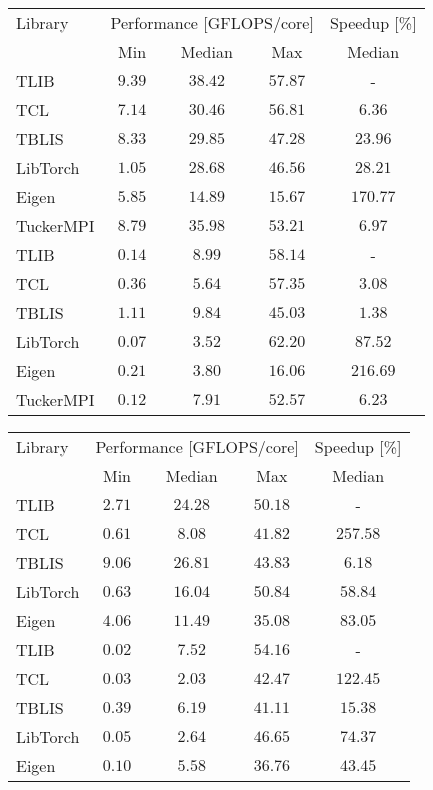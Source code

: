 \centering
\footnotesize
\begin{tabular}{lccc c}
	\toprule
	Library    & \multicolumn{3}{c}{Performance [GFLOPS/core]} & Speedup [\%] \\ 
	\cmidrule(lr){2-4} \cmidrule(lr){5-5}
	& Min   & Median  & Max & Median \\ 
	\midrule
	TLIB       & $\mathbf{9.39}$  & $\mathbf{38.42}$   & $\mathbf{57.87}$ &  - \\
	TCL        & $7.14$  & $30.46$   & $56.81$ & $6.36$     \\
	TBLIS      & $8.33$  & $29.85$   & $47.28$ & $23.96$     \\
	LibTorch   & $1.05$  & $28.68$   & $46.56$ & $28.21$     \\
	Eigen      & $5.85$  & $14.89$   & $15.67$ & $170.77$     \\
	TuckerMPI  & $8.79$  & $35.98$   & $53.21$ & $6.97$ \\
	\midrule
	TLIB       & $0.14$  & $8.99$    & $58.14$ &  -     \\
	TCL        & $0.36$  & $5.64$    & $57.35$ & $3.08$ \\
	TBLIS      & $\mathbf{1.11}$  & $\mathbf{9.84}$  & $45.03$ & $1.38$     \\
	LibTorch   & $0.07$  & $3.52$    & $\mathbf{62.20}$ & $87.52$     \\
	Eigen      & $0.21$  & $3.80$    & $16.06$ & $216.69$     \\
	TuckerMPI  & $0.12$  & $7.91$    & $52.57$ & $6.23$ \\
	\bottomrule
\end{tabular}
\hspace{5em}
\begin{tabular}{lccc c}
	\toprule
	Library    & \multicolumn{3}{c}{Performance [GFLOPS/core]} & Speedup [\%] \\ 
	\cmidrule(lr){2-4} \cmidrule(lr){5-5}
	& Min   & Median  & Max  & Median \\ 
	\midrule
	TLIB       & $2.71$  & $24.28$   & $\mathbf{50.18}$ &   -   \\
	TCL        & $0.61$  & $8.08$    & $41.82$ & $257.58$     \\
	TBLIS      & $\mathbf{9.06}$  & $\mathbf{26.81}$    & $43.83$ & $6.18$     \\
	LibTorch   & $0.63$  & $16.04$   & $50.84$ & $58.84$     \\
	Eigen      & $4.06$  & $11.49$   & $35.08$ & $83.05$     \\
	\midrule
	TLIB       & $0.02$  & $\mathbf{7.52}$  & $\mathbf{54.16}$ &  -  \\
	TCL        & $0.03$  & $2.03$    & $42.47$ & $122.45$     \\
	TBLIS      & $\mathbf{0.39}$  & $6.19$    & $41.11$ & $15.38$     \\
	LibTorch   & $0.05$  & $2.64$    & $46.65$ & $74.37$     \\
	Eigen      & $0.10$  & $5.58$    & $36.76$ & $43.45$     \\
	\bottomrule
\end{tabular}